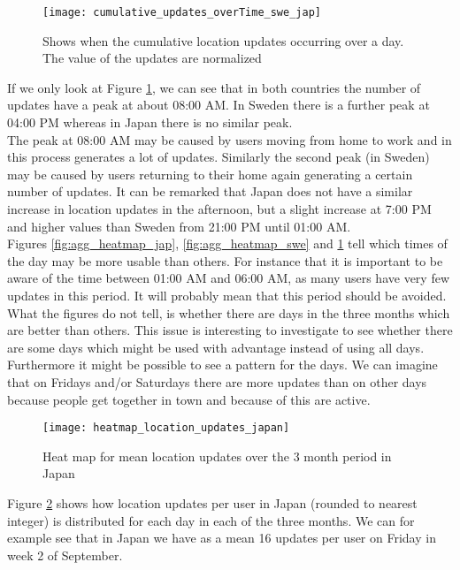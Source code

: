 \begin{figure}[H]
    \hspace*{-1.8cm}
    \centering
    \texttt{[image: cumulative\_updates\_overTime\_swe\_jap]}
    \caption{Shows when the cumulative location updates occurring over a day. The value of the updates are normalized}
    \label{fig:cumu_loc_time_jap_swe}
\end{figure}

If we only look at Figure \ref{fig:cumu_loc_time_jap_swe}, we can see that in both countries the number of updates have a peak at about 08:00 AM. In Sweden there is a further peak at 04:00 PM whereas in Japan there is no similar peak. \\
The peak at 08:00 AM may be caused by users moving from home to work and in this process generates a lot of updates. Similarly the second peak (in Sweden) may be caused by users returning to their home again generating a certain number of updates. It can be remarked that Japan does not have a similar increase in location updates in the afternoon, but a slight increase at 7:00 PM and higher values than Sweden from 21:00 PM until 01:00 AM. \\

Figures \ref{fig:agg_heatmap_jap}, \ref{fig:agg_heatmap_swe} and \ref{fig:cumu_loc_time_jap_swe} tell which times of the day may be more usable than others. For instance that it is important to be aware of the time between 01:00 AM and 06:00 AM, as many users have very few updates in this period. It will probably mean that this period should be avoided. 
What the figures do not tell, is whether there are days in the three months which are better than others. This issue is interesting to investigate to see whether there are some days which might be used with advantage instead of using all days. Furthermore it might be possible to see a pattern for the days. We can imagine that on Fridays and/or Saturdays there are more updates than on other days because people get together in town and because of this are active.  


\begin{figure}[H]
    \hspace*{-1.5cm}
    \centering
    \texttt{[image: heatmap\_location\_updates\_japan]}
    \caption{Heat map for mean location updates over the 3 month period in Japan}
    \label{fig:heatmap_jap}
\end{figure}

Figure \ref{fig:heatmap_jap} shows how location updates per user in Japan (rounded to nearest integer) is distributed for each day in each of the three months. We can for example see that in Japan we have as a mean 16 updates per user on Friday in week 2 of September.  

